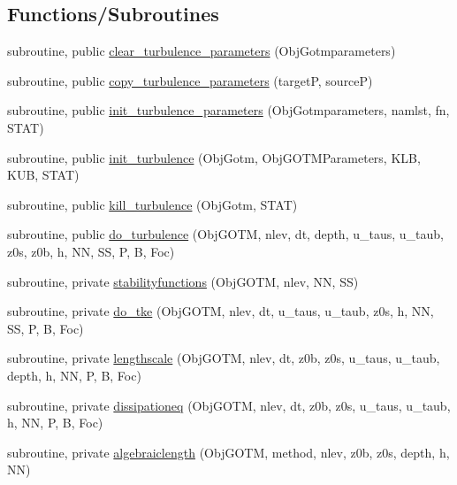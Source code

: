 \subsection*{Functions/\+Subroutines}
\begin{DoxyCompactItemize}
\item 
subroutine, public \mbox{\hyperlink{namespacemodulegotm_acc6ad2c4bea63b4d44a941b81fcbf402}{clear\+\_\+turbulence\+\_\+parameters}} (Obj\+Gotmparameters)
\item 
subroutine, public \mbox{\hyperlink{namespacemodulegotm_af408ddba849a968ba4867373805e4b3b}{copy\+\_\+turbulence\+\_\+parameters}} (targetP, sourceP)
\item 
subroutine, public \mbox{\hyperlink{namespacemodulegotm_a88820406e3c80bbfc120dbf96b66424b}{init\+\_\+turbulence\+\_\+parameters}} (Obj\+Gotmparameters, namlst, fn, S\+T\+AT)
\item 
subroutine, public \mbox{\hyperlink{namespacemodulegotm_a2bcdea4da65e0575591794282ca6ba41}{init\+\_\+turbulence}} (Obj\+Gotm, Obj\+G\+O\+T\+M\+Parameters, K\+LB, K\+UB, S\+T\+AT)
\item 
subroutine, public \mbox{\hyperlink{namespacemodulegotm_a52589088a0366839f7e6684a9917a71a}{kill\+\_\+turbulence}} (Obj\+Gotm, S\+T\+AT)
\item 
subroutine, public \mbox{\hyperlink{namespacemodulegotm_a4ca35153e188114f4f02fe276d302d14}{do\+\_\+turbulence}} (Obj\+G\+O\+TM, nlev, dt, depth, u\+\_\+taus, u\+\_\+taub, z0s, z0b, h, NN, SS, P, B, Foc)
\item 
subroutine, private \mbox{\hyperlink{namespacemodulegotm_a0e2f0ad43d12c00ed95b6fdef24dc5eb}{stabilityfunctions}} (Obj\+G\+O\+TM, nlev, NN, SS)
\item 
subroutine, private \mbox{\hyperlink{namespacemodulegotm_ae39109acd910c29deba62e83a6edce50}{do\+\_\+tke}} (Obj\+G\+O\+TM, nlev, dt, u\+\_\+taus, u\+\_\+taub, z0s, h, NN, SS, P, B, Foc)
\item 
subroutine, private \mbox{\hyperlink{namespacemodulegotm_a2d9e32d408a390b64575234c5dd95f62}{lengthscale}} (Obj\+G\+O\+TM, nlev, dt, z0b, z0s, u\+\_\+taus, u\+\_\+taub, depth, h, NN, P, B, Foc)
\item 
subroutine, private \mbox{\hyperlink{namespacemodulegotm_ac05dd8d50f9ddc2c286122142f8a400e}{dissipationeq}} (Obj\+G\+O\+TM, nlev, dt, z0b, z0s, u\+\_\+taus, u\+\_\+taub, h, NN, P, B, Foc)
\item 
subroutine, private \mbox{\hyperlink{namespacemodulegotm_a91db88191066626042c7b8aba8a116ab}{algebraiclength}} (Obj\+G\+O\+TM, method, nlev, z0b, z0s, depth, h, NN)

\end{DoxyCompactItemize}
